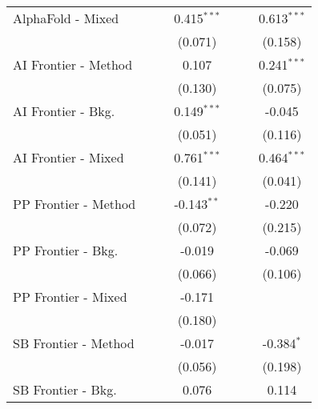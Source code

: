 \begin{tabular}{lcccccc}
   AlphaFold - Mixed    &               &               & 0.415$^{***}$  &               &               & 0.613$^{***}$\\   
                        &               &               & (0.071)        &               &               & (0.158)\\   
   AI Frontier - Method &               &               & 0.107          &               &               & 0.241$^{***}$\\   
                        &               &               & (0.130)        &               &               & (0.075)\\   
   AI Frontier - Bkg.   &               &               & 0.149$^{***}$  &               &               & -0.045\\   
                        &               &               & (0.051)        &               &               & (0.116)\\   
   AI Frontier - Mixed  &               &               & 0.761$^{***}$  &               &               & 0.464$^{***}$\\   
                        &               &               & (0.141)        &               &               & (0.041)\\   
   PP Frontier - Method &               &               & -0.143$^{**}$  &               &               & -0.220\\   
                        &               &               & (0.072)        &               &               & (0.215)\\   
   PP Frontier - Bkg.   &               &               & -0.019         &               &               & -0.069\\   
                        &               &               & (0.066)        &               &               & (0.106)\\   
   PP Frontier - Mixed  &               &               & -0.171         &               &               &   \\   
                        &               &               & (0.180)        &               &               &   \\   
   SB Frontier - Method &               &               & -0.017         &               &               & -0.384$^{*}$\\   
                        &               &               & (0.056)        &               &               & (0.198)\\   
   SB Frontier - Bkg.   &               &               & 0.076          &               &               & 0.114\\   

\end{tabular}
